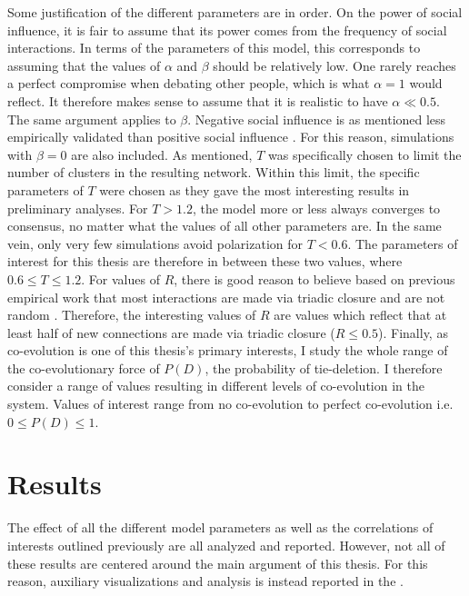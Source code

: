 \documentclass[11pt]{article}
\begin{document}
\noindent Some justification of the different parameters are in order. 
On the power of social influence, it is fair to assume that its power comes from the frequency of social interactions. In terms of the parameters of this model, this corresponds to assuming that the values of $\alpha$ and $\beta$ should be relatively low.
One rarely reaches a perfect compromise when debating other people, which is what $\alpha = 1$ would reflect. It therefore makes sense to assume that it is realistic to have $\alpha \ll 0.5$. 
The same argument applies to $\beta$. Negative social influence is as mentioned less empirically validated than positive social influence \cite{takacs_is_2014}. For this reason, simulations with $\beta = 0$ are also included. 
As mentioned, $T$ was specifically chosen to limit the number of clusters in the resulting network. Within this limit, the specific parameters of $T$ were chosen as they gave the most interesting results in preliminary analyses. For $T > 1.2$, the model more or less always converges to consensus, no matter what the values of all other parameters are. In the same vein, only very few simulations avoid polarization for $T < 0.6$. The parameters of interest for this thesis are therefore in between these two values, where $0.6 \leq T \leq 1.2$. 
For values of $R$, there is good reason to believe based on previous empirical work that most interactions are made via triadic closure and are not random \cite{kossinets_origins_2009}. Therefore, the interesting values of $R$ are values which reflect that at least half of new connections are made via triadic closure ($R \leq 0.5$).
Finally, as co-evolution is one of this thesis's primary interests, I study the whole range of the co-evolutionary force of $P(D)$, the probability of tie-deletion. I therefore consider a range of values resulting in different levels of co-evolution in the system. Values of interest range from no co-evolution to perfect co-evolution i.e. $0 \leq P(D) \leq 1$.

\section{Results}
The effect of all the different model parameters as well as the correlations of interests outlined previously are all analyzed and reported. However, not all of these results are centered around the main argument of this thesis. For this reason, auxiliary visualizations and analysis is instead reported in the \textit{}.
\end{document}

